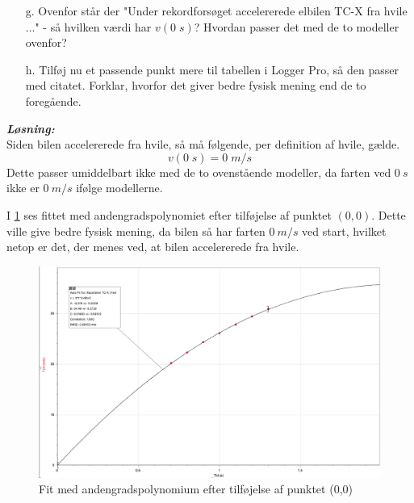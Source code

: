 \documentclass{report}
\newcommand{\sol}{\setlength{\parindent}{0cm}\textbf{\textit{Løsning:}}\setlength{\parindent}{1cm}}
\begin{document}
\begin{question}{}{}
\begin{itemize}
  \item[g.] Ovenfor står der "Under rekordforsøget accelererede elbilen TC-X fra hvile ..." - så hvilken værdi har $v(0\;\unit{s})$? Hvordan passer det med de to modeller ovenfor?
  \item[h.] Tilføj nu et passende punkt mere til tabellen i Logger Pro, så den passer med citatet. Forklar, hvorfor det giver bedre fysisk mening end de to foregående.
\end{itemize}
\end{question}
\sol \\ 
Siden bilen accelererede fra hvile, så må følgende, per definition af hvile, gælde.
\[
v(0\;\unit{s})=0\;\unit{m/s}
\] 
Dette passer umiddelbart ikke med de to ovenstående modeller, da farten ved $\qty{0}{s}$ ikke er $\qty{0}{m/s}$ ifølge modellerne.\par
I \cref{fig:3} ses fittet med andengradspolynomiet efter tilføjelse af punktet $(0,0)$. Dette ville give bedre fysisk mening, da bilen så har farten $\qty{0}{m/s}$ ved start, hvilket netop er det, der menes ved, at bilen accelererede fra hvile.
\begin{figure}[h]
\begin{center}
  \includegraphics[scale=0.3]{H4_3.png}
\end{center}
  \caption{Fit med andengradspolynomium efter tilføjelse af punktet (0,0)}
\label{fig:3}
\end{figure}
\pagebreak
\end{document}
